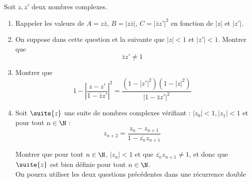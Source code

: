 \documentclass[a4paper, 11pt,reqno]{article}
\begin{document}
\begin{exercice}
Soit $z,z'$ deux nombres complexes.

\begin{enumerate}
\item Rappeler les valeurs de $A=z\bar{z}$, $B=|z\bar{z}|$, $C=|\bar{z}z'|^2$ en fonction de $|z|$ et $|z'|$. 
\item On suppose dans cette question et  la suivante que $|z|<1 $ et $|z' |<1$. Montrer que $$\bar{z}z'\neq 1$$

\item  Montrer que 
$$1- \left| \frac{z-z'}{1-\bar{z} z' } \right|^2 = \frac{(1-|z'|^2)(1-|z|^2)}{|1-\bar{z}z'|^2}$$
\item Soit $\suite{z}$ une suite de nombres complexes vérifiant : $|z_0|<1, |z_1|<1$  et pour tout $n\in \N$ :
$$z_{n+2} =\frac{z_n-z_{n+1}}{1-\bar{z_{n}} z_{n+1}}$$

Montrer que pour tout $n\in \N$, $|z_n|<1$ et que $\bar{z_n}z_{n+1}\neq 1$, et donc que $\suite{z}$ est bien définie pour tout $n\in \N$. \\
\footnotesize{On pourra utiliser les deux questions précédentes dans une récurrence double}

\end{enumerate}
\end{exercice}
\end{document}
